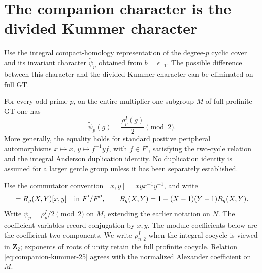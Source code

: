 \section{The companion character is the divided Kummer character}
\label{sec:companion-kummer-equality}

Use the integral compact-homology representation of the degree-\(p\)
cyclic cover and its invariant character \(\widetilde\psi_p\) obtained
from \(b=\epsilon_{-1}\). The possible difference between this character
and the divided Kummer character can be eliminated on full GT.

\begin{theorem}\label{thm:companion-kummer-equality}
For every odd prime \(p\), on the entire multiplier-one subgroup
\(M\) of full profinite GT one has
\begin{equation}
             \boxed{\quad
             \widetilde\psi_p(g)=\frac{\rho_p^I(g)}2\pmod2.
             \quad}                                      
\label{eq:companion-kummer-24}
\end{equation}
More generally, the equality holds for standard positive peripheral
automorphisms \(x\mapsto x\), \(y\mapsto f^{-1}yf\), with
\(f\in F'\), satisfying the two-cycle relation and the integral
Anderson duplication identity. No duplication identity is assumed
for a larger gentle group unless it has been separately established.
\end{theorem}

Use the commutator convention \([x,y]=xyx^{-1}y^{-1}\), and write
\begin{equation}
 [f]=R_g(X,Y)[x,y]\quad\hbox{in }F'/F'',\qquad
 B_g(X,Y)=1+(X-1)(Y-1)R_g(X,Y).
\label{eq:companion-kummer-25}
\end{equation}
Write \(\psi_p=\rho_p^I/2\pmod2\) on \(M\), extending the
earlier notation on \(N\). The coefficient variables record conjugation by \(x,y\). The module
coefficients below are the coefficient-two components. We write
\(\rho_{n,2}^I\) when the integral cocycle is viewed in \(\mathbf Z_2\);
exponents of roots of unity retain the full profinite cocycle.
Relation \eqref{eq:companion-kummer-25} agrees with the normalized Alexander coefficient on \(M\).

